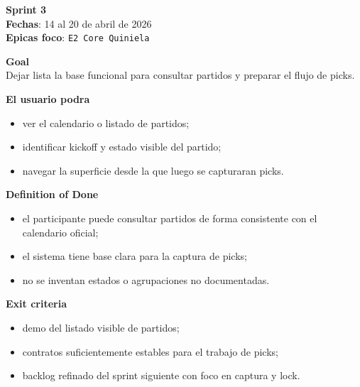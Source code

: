\begin{docnote}
\textbf{Sprint 3}\\
\textbf{Fechas}: 14 al 20 de abril de 2026\\
\textbf{Epicas foco}: \texttt{E2 Core Quiniela}

\textbf{Goal}\\
Dejar lista la base funcional para consultar partidos y preparar el flujo de picks.

\textbf{El usuario podra}\\
\begin{itemize}
  \item ver el calendario o listado de partidos;
  \item identificar kickoff y estado visible del partido;
  \item navegar la superficie desde la que luego se capturaran picks.
\end{itemize}

\textbf{Definition of Done}\\
\begin{itemize}
  \item el participante puede consultar partidos de forma consistente con el calendario oficial;
  \item el sistema tiene base clara para la captura de picks;
  \item no se inventan estados o agrupaciones no documentadas.
\end{itemize}

\textbf{Exit criteria}\\
\begin{itemize}
  \item demo del listado visible de partidos;
  \item contratos suficientemente estables para el trabajo de picks;
  \item backlog refinado del sprint siguiente con foco en captura y lock.
\end{itemize}
\end{docnote}

